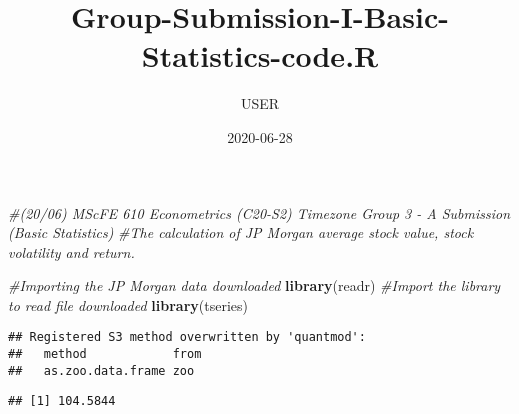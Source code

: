 \documentclass[
]{article}
\title{Group-Submission-I-Basic-Statistics-code.R}
\author{USER}
\date{2020-06-28}
\newenvironment{Shaded}{\begin{snugshade}}{\end{snugshade}}
\newcommand{\CommentTok}[1]{\textcolor[rgb]{0.56,0.35,0.01}{\textit{#1}}}
\newcommand{\DataTypeTok}[1]{\textcolor[rgb]{0.13,0.29,0.53}{#1}}
\newcommand{\DecValTok}[1]{\textcolor[rgb]{0.00,0.00,0.81}{#1}}
\newcommand{\KeywordTok}[1]{\textcolor[rgb]{0.13,0.29,0.53}{\textbf{#1}}}
\newcommand{\NormalTok}[1]{#1}
\newcommand{\OperatorTok}[1]{\textcolor[rgb]{0.81,0.36,0.00}{\textbf{#1}}}
\newcommand{\StringTok}[1]{\textcolor[rgb]{0.31,0.60,0.02}{#1}}
\begin{document}
\maketitle

\begin{Shaded}
\begin{Highlighting}[]
\CommentTok{#(20/06) MScFE 610 Econometrics (C20-S2) Timezone Group 3 - A Submission (Basic Statistics)}
\CommentTok{#The calculation of JP Morgan average stock value, stock volatility and return.}


\CommentTok{#Importing the JP Morgan data downloaded }
\KeywordTok{library}\NormalTok{(readr) }\CommentTok{#Import the library to read file downloaded}
\KeywordTok{library}\NormalTok{(tseries)}
\end{Highlighting}
\end{Shaded}

\begin{verbatim}
## Registered S3 method overwritten by 'quantmod':
##   method            from
##   as.zoo.data.frame zoo
\end{verbatim}

\begin{Shaded}
\end{Shaded}

\begin{verbatim}
## [1] 104.5844
\end{verbatim}

\begin{Shaded}
\end{Shaded}
\end{document}
